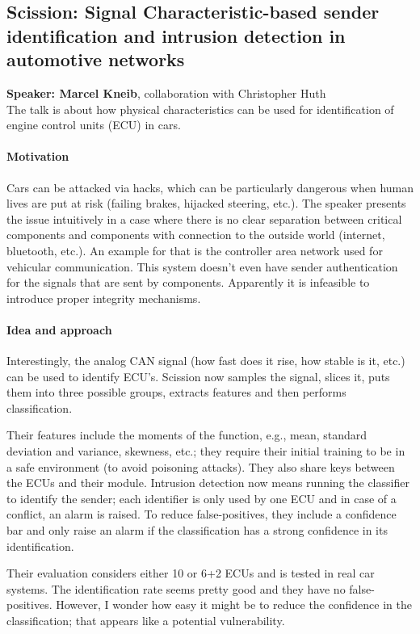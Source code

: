 \documentclass{article}
\begin{document}
\subsection{Scission: Signal Characteristic-based sender identification and intrusion detection in automotive networks}
\noindent\textbf{Speaker: Marcel Kneib}, collaboration with Christopher Huth\\

The talk is about how physical characteristics can be used for identification of engine control units (ECU) in cars.

\paragraph{Motivation}
Cars can be attacked via hacks, which can be particularly dangerous when human lives are put at risk (failing brakes, hijacked steering, etc.). The speaker presents the issue intuitively in a case where there is no clear separation between critical components and components with connection to the outside world (internet, bluetooth, etc.). An example for that is the controller area network used for vehicular communication. This system doesn't even have sender authentication for the signals that are sent by components. Apparently it is infeasible to introduce proper integrity mechanisms.

\paragraph{Idea and approach}
Interestingly, the analog CAN signal (how fast does it rise, how stable is it, etc.) can be used to identify ECU's. Scission now samples the signal, slices it, puts them into three possible groups, extracts features and then performs classification.

Their features include the moments of the function, e.g., mean, standard deviation and variance, skewness, etc.; they require their initial training to be in a safe environment (to avoid poisoning attacks). They also share keys between the ECUs and their module. Intrusion detection now means running the classifier to identify the sender; each identifier is only used by one ECU and in case of a conflict, an alarm is raised. To reduce false-positives, they include a confidence bar and only raise an alarm if the classification has a strong confidence in its identification. 

Their evaluation considers either 10 or 6+2 ECUs and is tested in real car systems. The identification rate seems pretty good and they have no false-positives. However, I wonder how easy it might be to reduce the confidence in the classification; that appears like a potential vulnerability.
\end{document}
